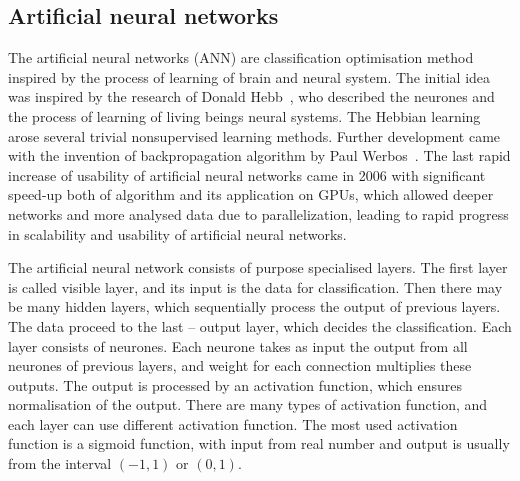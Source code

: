 \documentclass[
  print, %
  Table,   %
  nolof,     %
  nolot,     %
  11pt, %
  oneside  %
]{fithesis3}
\begin{document}
\subsection{Artificial neural networks}
\label{subsec:opt-other-ann}


The artificial neural networks (ANN) are classification optimisation method inspired by the process of learning of brain and neural system. The initial idea was inspired by the research of Donald Hebb~\cite{hebb49learning}, who described the neurones and the process of learning of living beings neural systems. The Hebbian learning arose several trivial nonsupervised learning methods. Further development came with the invention of backpropagation algorithm by Paul Werbos~\cite{werbos75beyondThesis}. The last rapid increase of usability of artificial neural networks came in 2006 with significant speed-up both of algorithm and its application on GPUs, which allowed deeper networks and more analysed data due to parallelization, leading to rapid progress in scalability and usability of artificial neural networks.

The artificial neural network consists of purpose specialised layers. The first layer is called visible layer, and its input is the data for classification. Then there may be many hidden layers, which sequentially process the output of previous layers. The data proceed to the last -- output layer, which decides the classification. Each layer consists of neurones. Each neurone takes as input the output from all neurones of previous layers, and weight for each connection multiplies these outputs. The output is processed by an activation function, which ensures normalisation of the output. There are many types of activation function, and each layer can use different activation function. The most used activation function is a sigmoid function, with input from real number and output is usually from the interval $(-1, 1)$ or $(0, 1)$.
\end{document}
